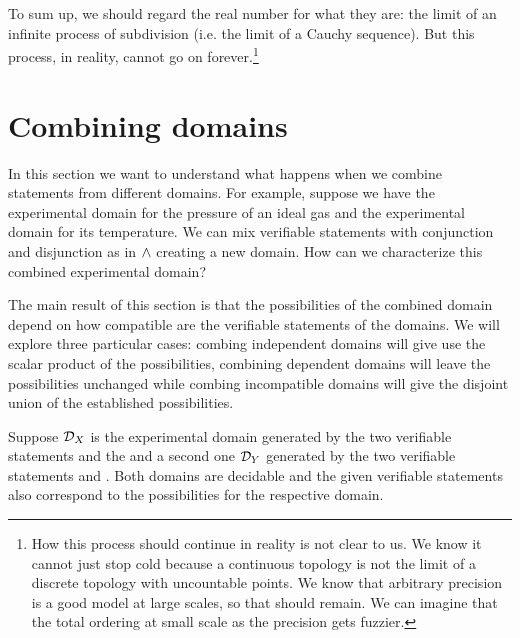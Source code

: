 \documentclass[11pt,letterpaper,fleqn]{memoir} %
\begin{document}
To sum up, we should regard the real number for what they are: the limit of an infinite process of subdivision (i.e. the limit of a Cauchy sequence). But this process, in reality, cannot go on forever.\footnote{How this process should continue in reality is not clear to us. We know it cannot just stop cold because a continuous topology is not the limit of a discrete topology with uncountable points. We know that arbitrary precision is a good model at large scales, so that should remain. We can imagine that the total ordering at small scale as the precision gets fuzzier.}


\section{Combining domains}

In this section we want to understand what happens when we combine statements from different domains. For example, suppose we have the experimental domain for the pressure of an ideal gas and the experimental domain for its temperature. We can mix verifiable statements with conjunction and disjunction as in $\wedge$ creating a new domain. How can we characterize this combined experimental domain?

The main result of this section is that the possibilities of the combined domain depend on how compatible are the verifiable statements of the domains. We will explore three particular cases: combing independent domains will give use the scalar product of the possibilities, combining dependent domains will leave the possibilities unchanged while combing incompatible domains will give the disjoint union of the established possibilities.

Suppose $\mathcal{D}_X$ is the experimental domain generated by the two verifiable statements  and the  and a second one $\mathcal{D}_Y$ generated by the two verifiable statements  and . Both domains are decidable and the given verifiable statements also correspond to the possibilities for the respective domain.
\end{document}

